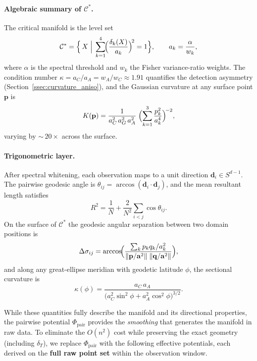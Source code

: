 \documentclass[11pt,a4paper]{article}
\newcommand{\Cman}{\mathcal{C}^*}
\newcommand{\norm}[1]{\|#1\|}
\begin{document}
\paragraph{Algebraic summary of $\Cman$.}
The critical manifold is the level set
\begin{equation}\label{eq:Cstar_ellipsoid}
  \Cman = \Bigl\{\,X \;\Big|\;
    \sum_{k=1}^{4}\!\Bigl(\frac{\delta_k(X)}{a_k}\Bigr)^{\!2} = 1\Bigr\},
  \qquad a_k = \frac{\alpha}{w_k},
\end{equation}
where $\alpha$ is the spectral threshold and $w_k$ the Fisher
variance-ratio weights.  The condition number
$\kappa = a_C / a_A = w_A / w_C \approx 1.91$ quantifies the detection
asymmetry (Section~\ref{ssec:curvature_aniso}), and the Gaussian
curvature at any surface point $\mathbf{p}$ is
\begin{equation}\label{eq:K_pairwise}
  K(\mathbf{p})
  = \frac{1}{a_C^2\,a_G^2\,a_A^2}\;
    \Bigl(\sum_{k=1}^{3}\frac{p_k^2}{a_k^4}\Bigr)^{\!-2},
\end{equation}
varying by ${\sim}\,20\times$ across the surface.

\paragraph{Trigonometric layer.}
After spectral whitening, each observation maps to a unit direction
$\mathbf{d}_i \in S^{d-1}$.  The pairwise geodesic angle is
$\theta_{ij} = \arccos(\mathbf{d}_i \cdot \mathbf{d}_j)$,
and the mean resultant length satisfies
\begin{equation}\label{eq:R2_pairwise}
  R^2 = \frac{1}{N} + \frac{2}{N^2}\sum_{i<j}\cos\theta_{ij}.
\end{equation}
On the surface of $\Cman$ the geodesic angular separation between two
domain positions is
\begin{equation}\label{eq:Delta_sigma}
  \Delta\sigma_{ij}
  = \arccos\!\Bigl(
      \frac{\sum_k p_k q_k / a_k^2}
           {\norm{\mathbf{p}/\mathbf{a}^2}\;\norm{\mathbf{q}/\mathbf{a}^2}}
    \Bigr),
\end{equation}
and along any great-ellipse meridian with geodetic latitude $\phi$,
the sectional curvature is
\begin{equation}\label{eq:kappa_phi}
  \kappa(\phi)
  = \frac{a_C\, a_A}
         {\bigl(a_C^2\sin^2\!\phi + a_A^2\cos^2\!\phi\bigr)^{3/2}}.
\end{equation}

While these quantities fully describe the manifold and its directional
properties, the pairwise potential $\Phi_{\mathrm{pair}}$ provides the
\emph{smoothing} that generates the manifold in raw data.  To eliminate
the $O(n^2)$ cost while preserving the exact geometry (including
$\delta_T$), we replace $\Phi_{\mathrm{pair}}$ with the following
effective potentials, each derived on the \textbf{full raw point set}
within the observation window.
\end{document}
